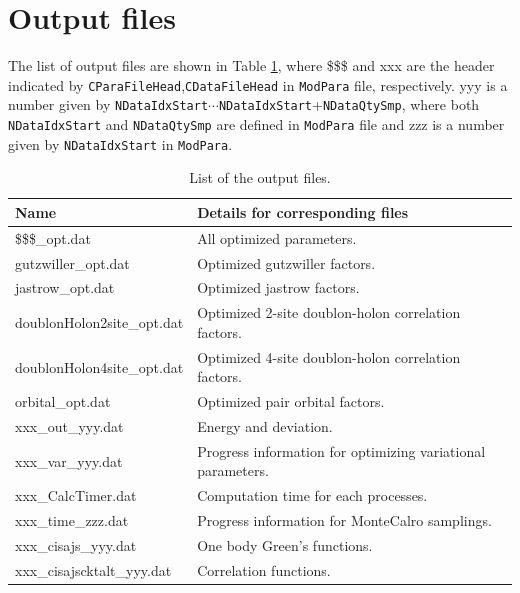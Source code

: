 \newpage
\section{Output files}
\label{Sec:outputfile}
The list of output files are shown in Table \ref{Table:Output}, where \$\$\$ and xxx are the header indicated by \verb|CParaFileHead|,\verb|CDataFileHead| in \verb|ModPara| file, respectively. yyy is a number given by \verb|NDataIdxStart|$\cdots$\verb|NDataIdxStart|+\verb|NDataQtySmp|, where both \verb|NDataIdxStart| and \verb|NDataQtySmp| are defined in \verb|ModPara| file and zzz is a number given by \verb|NDataIdxStart| in \verb|ModPara|.

 \begin{table}[h!]
\begin{center}
  \begin{tabular}{|ll|} \hline
           Name     & Details for corresponding files       \\   \hline\hline
           \$\$\$\_opt.dat       &  All optimized parameters.       \\ \hline 
           gutzwiller\_opt.dat       &   Optimized gutzwiller factors.  \\
           jastrow\_opt.dat        &  Optimized jastrow factors.         \\ 
           doublonHolon2site\_opt.dat  &   Optimized 2-site doublon-holon correlation factors.  \\  
           doublonHolon4site\_opt.dat  &   Optimized 4-site doublon-holon correlation factors. \\  
           orbital\_opt.dat  &   Optimized pair orbital factors. \\  \hline
           xxx\_out\_yyy.dat &  Energy and deviation.\\ 
           xxx\_var\_yyy.dat &  Progress information for optimizing variational parameters.\\  \hline
           xxx\_CalcTimer.dat & Computation time for each processes.\\  
           xxx\_time\_zzz.dat & Progress information for MonteCalro samplings.\\  \hline
           \hline
           xxx\_cisajs\_yyy.dat & One body Green's functions.\\
           xxx\_cisajscktalt\_yyy.dat & Correlation functions.\\
\hline
  \end{tabular}
\end{center}
\caption{List of the output files. }
\label{Table:Output}
\end{table}%

